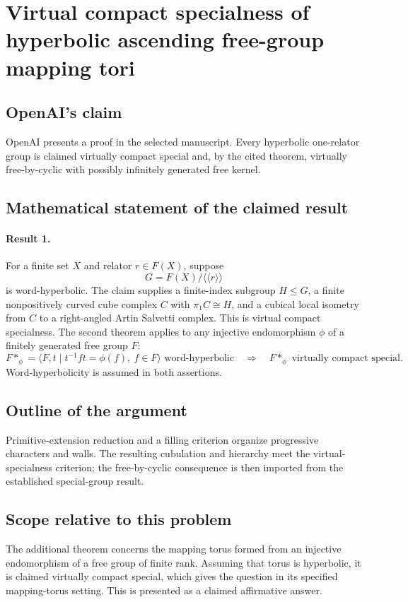 \documentclass[11pt]{article}
\begin{document}
\section*{Virtual compact specialness of hyperbolic ascending free-group mapping tori}

\subsection{OpenAI's claim}
OpenAI presents a proof in the selected manuscript. Every hyperbolic one-relator group is claimed virtually compact special and, by the cited theorem, virtually free-by-cyclic with possibly infinitely generated free kernel.

\subsection{Mathematical statement of the claimed result}
\paragraph{Result 1.} For a finite set \(X\) and relator \(r\in F(X)\), suppose
\[
 G=F(X)/\langle\!\langle r\rangle\!\rangle
\]
is word-hyperbolic. The claim supplies a finite-index subgroup \(H\le G\), a finite nonpositively curved cube complex \(C\) with \(\pi_1C\cong H\), and a cubical local isometry from \(C\) to a right-angled Artin Salvetti complex. This is virtual compact specialness. The second theorem applies to any injective endomorphism \(\phi\) of a finitely generated free group \(F\):
\[
 F*_{\phi}=\langle F,t\mid t^{-1}ft=\phi(f),\ f\in F\rangle
 \text{ word-hyperbolic}\quad\Longrightarrow\quad F*_{\phi}\text{ virtually compact special}.
\]
Word-hyperbolicity is assumed in both assertions.

\subsection{Outline of the argument}
Primitive-extension reduction and a filling criterion organize progressive characters and walls. The resulting cubulation and hierarchy meet the virtual-specialness criterion; the free-by-cyclic consequence is then imported from the established special-group result.

\subsection{Scope relative to this problem}
The additional theorem concerns the mapping torus formed from an injective endomorphism of a free group of finite rank. Assuming that torus is hyperbolic, it is claimed virtually compact special, which gives the question in its specified mapping-torus setting. This is presented as a claimed affirmative answer.
\end{document}
